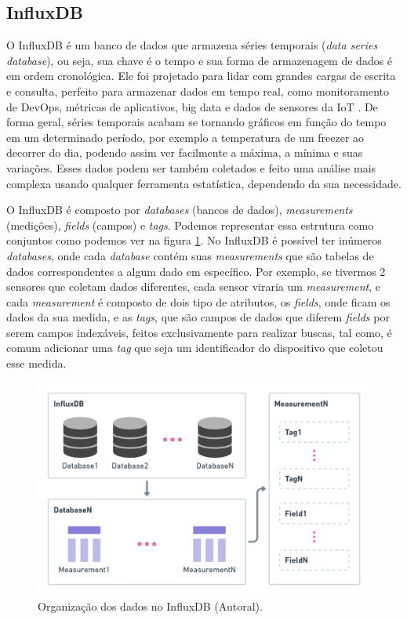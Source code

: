 \subsection{InfluxDB}
\label{fund:influxdb}
O InfluxDB é um banco de dados que armazena séries temporais (\textit{data series database}), ou seja, sua chave é o tempo e sua forma de armazenagem de dados é em ordem cronológica. Ele foi projetado para lidar com grandes cargas de escrita e consulta, perfeito para armazenar dados em tempo real, como monitoramento de DevOps, métricas de aplicativos, big data e dados de sensores da IoT \cite{giacobbe2018implementation}. De forma geral, séries temporais acabam se tornando gráficos em função do tempo em um determinado período, por exemplo a temperatura de um freezer ao decorrer do dia, podendo assim ver facilmente a máxima, a mínima e suas variações. Esses dados podem ser também coletados e feito uma análise mais complexa usando qualquer ferramenta estatística, dependendo da sua necessidade.

O InfluxDB é composto por \textit{databases} (bancos de dados), \textit{measurements} (medições), \textit{fields} (campos) e \textit{tags}. Podemos representar essa estrutura como conjuntos como podemos ver na figura \ref{fig:influxdb-struct}. No InfluxDB é possível ter inúmeros \textit{databases}, onde cada \textit{database} contém suas \textit{measurements} que são tabelas de dados correspondentes a algum dado em específico. Por exemplo, se tivermos 2 sensores que coletam dados diferentes, cada sensor viraria um \textit{measurement}, e cada \textit{measurement} é composto  de dois tipo de atributos, os \textit{fields}, onde ficam os dados da sua medida, e as \textit{tags}, que são campos de dados que diferem \textit{fields} por serem campos indexáveis, feitos exclusivamente para realizar buscas, tal como, é comum adicionar uma \textit{tag} que seja um identificador do dispositivo que coletou esse medida.

\begin{figure}[H]
  \centering
  \includegraphics[width=.80\textwidth]{assets/influxdb-struct.png} 
  \caption{Organização dos dados no InfluxDB (Autoral).}
  \label{fig:influxdb-struct} 
\end{figure}

